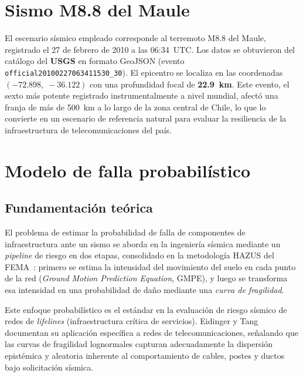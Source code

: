 \documentclass[12pt,a4paper]{article}
\begin{document}
\section{Sismo M8.8 del Maule}

El escenario sísmico empleado corresponde al terremoto M8.8 del Maule,
registrado el 27 de febrero de 2010 a las 06:34~UTC.  Los datos se
obtuvieron del catálogo del \textbf{USGS} en formato GeoJSON (evento
\texttt{official20100227063411530\_30}).  El epicentro se localiza en las
coordenadas $(-72.898,\;-36.122)$ con una profundidad focal de
\textbf{22.9~km}.  Este evento, el sexto más potente registrado
instrumentalmente a nivel mundial, afectó una franja de más de 500~km a lo
largo de la zona central de Chile, lo que lo convierte en un escenario de
referencia natural para evaluar la resiliencia de la infraestructura de
telecomunicaciones del país.


\section{Modelo de falla probabilístico}

\subsection{Fundamentación teórica}

El problema de estimar la probabilidad de falla de componentes de
infraestructura ante un sismo se aborda en la ingeniería sísmica mediante
un \textit{pipeline} de riesgo en dos etapas, consolidado en la
metodología HAZUS del FEMA~\cite{hazus}: primero se estima la intensidad
del movimiento del suelo en cada punto de la red (\textit{Ground Motion
Prediction Equation}, GMPE), y luego se transforma esa intensidad en una
probabilidad de daño mediante una \textit{curva de fragilidad}.

Este enfoque probabilístico es el estándar en la evaluación de riesgo
sísmico de redes de \textit{lifelines} (infraestructura crítica de
servicios).  Eidinger y Tang~\cite{eidinger2012} documentan su aplicación
específica a redes de telecomunicaciones, señalando que las curvas de
fragilidad lognormales capturan adecuadamente la dispersión epistémica y
aleatoria inherente al comportamiento de cables, postes y ductos bajo
solicitación sísmica.
\end{document}
